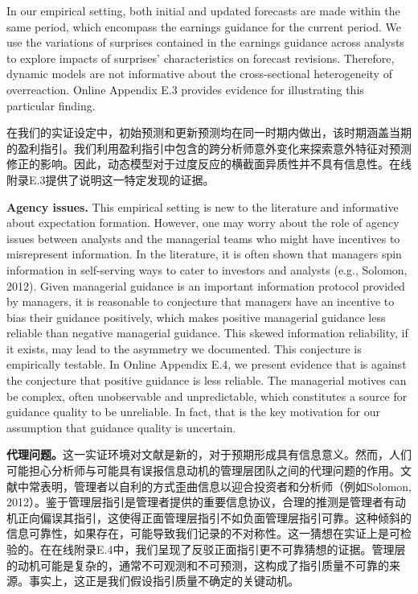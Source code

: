 \documentclass[12pt,a4paper]{article}
\newenvironment{original}
  {\par\medskip\noindent\ignorespaces}
  {\par\medskip}
\newenvironment{translation}
  {\par\noindent{\color{transblue}\ignorespaces}}
  {\par\bigskip}
\begin{document}
\begin{original}
In our empirical setting, both initial and updated forecasts are made within the same period, which encompass the earnings guidance for the current period. We use the variations of surprises contained in the earnings guidance across analysts to explore impacts of surprises' characteristics on forecast revisions. Therefore, dynamic models are not informative about the cross-sectional heterogeneity of overreaction. Online Appendix E.3 provides evidence for illustrating this particular finding.
\end{original}
\begin{translation}
在我们的实证设定中，初始预测和更新预测均在同一时期内做出，该时期涵盖当期的盈利指引。我们利用盈利指引中包含的跨分析师意外变化来探索意外特征对预测修正的影响。因此，动态模型对于过度反应的横截面异质性并不具有信息性。在线附录E.3提供了说明这一特定发现的证据。
\end{translation}

\begin{original}
\textbf{Agency issues.} This empirical setting is new to the literature and informative about expectation formation. However, one may worry about the role of agency issues between analysts and the managerial teams who might have incentives to misrepresent information. In the literature, it is often shown that managers spin information in self-serving ways to cater to investors and analysts (e.g., Solomon, 2012). Given managerial guidance is an important information protocol provided by managers, it is reasonable to conjecture that managers have an incentive to bias their guidance positively, which makes positive managerial guidance less reliable than negative managerial guidance. This skewed information reliability, if it exists, may lead to the asymmetry we documented. This conjecture is empirically testable. In Online Appendix E.4, we present evidence that is against the conjecture that positive guidance is less reliable. The managerial motives can be complex, often unobservable and unpredictable, which constitutes a source for guidance quality to be unreliable. In fact, that is the key motivation for our assumption that guidance quality is uncertain.
\end{original}
\begin{translation}
\textbf{代理问题。}这一实证环境对文献是新的，对于预期形成具有信息意义。然而，人们可能担心分析师与可能具有误报信息动机的管理层团队之间的代理问题的作用。文献中常表明，管理者以自利的方式歪曲信息以迎合投资者和分析师（例如Solomon, 2012）。鉴于管理层指引是管理者提供的重要信息协议，合理的推测是管理者有动机正向偏误其指引，这使得正面管理层指引不如负面管理层指引可靠。这种倾斜的信息可靠性，如果存在，可能导致我们记录的不对称性。这一猜想在实证上是可检验的。在在线附录E.4中，我们呈现了反驳正面指引更不可靠猜想的证据。管理层的动机可能是复杂的，通常不可观测和不可预测，这构成了指引质量不可靠的来源。事实上，这正是我们假设指引质量不确定的关键动机。
\end{translation}
\end{document}
